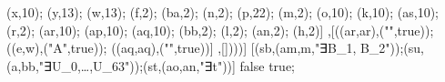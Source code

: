 (x,10); (y,13); (w,13); (f,2); (ba,2); (n,2); (p,22); (m,2); (o,10); (k,10); (as,10); (r,2); (ar,10); (ap,10); (aq,10); (bb,2); (l,2); (an,2); (h,2)] ,[((ar,ar),("",true)); ((e,w),("\state A",true)); ((aq,aq),("",true))] ,[])))] [(sb,(am,m,"∃B_1, B_2"));(su,(a,bb,"∃U_0,\ldots,U_{63}"));(st,(ao,an,"∃t"))] false true;
